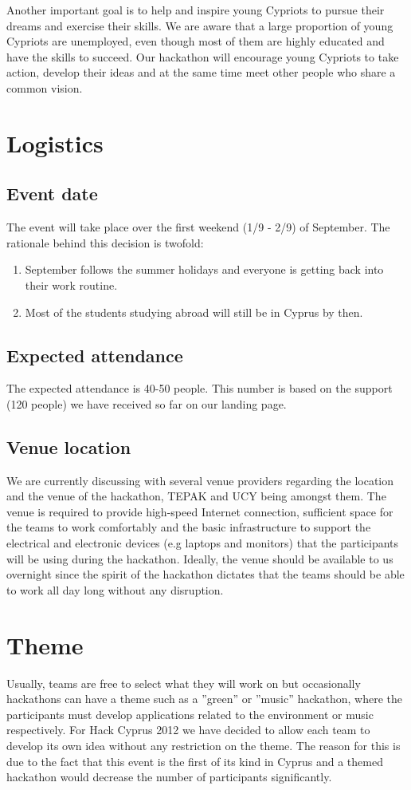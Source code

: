 \documentclass[a4paper,11pt]{report}
\begin{document}
Another important goal is to help and inspire young Cypriots to pursue their dreams and exercise their skills. We are aware that a large proportion of young Cypriots are unemployed, even though most of them are highly educated and have the skills to succeed. Our hackathon will encourage young Cypriots to take action, develop their ideas and at the same time meet other people who share a common vision. 

\section{Logistics}
\subsection{Event date}
The event will take place over the first weekend (1/9 - 2/9) of September. The rationale behind this decision is twofold:
\begin{enumerate}
  \item September follows the summer holidays and everyone is getting back into their work routine.
  \item Most of the students studying abroad will still be in Cyprus by then.
\end{enumerate}
\subsection{Expected attendance}
The expected attendance is 40-50 people. This number is based on the support (120 people) we have received so far on our landing page.
\subsection{Venue location}
We are currently discussing with several venue providers regarding the location and the venue of the hackathon, TEPAK and UCY being amongst them. The venue is required to provide high-speed Internet connection, sufficient space for the teams to work comfortably and the basic infrastructure to support the electrical and electronic devices (e.g laptops and monitors) that the participants will be using during the hackathon. Ideally, the venue should be available to us overnight since the spirit of the hackathon dictates that the teams should be able to work all day long without any disruption. 
 
\section{Theme}
Usually, teams are free to select what they will work on but occasionally hackathons can have a theme such as a ''green'' or ''music'' hackathon, where the participants must develop applications related to the environment or music respectively. For Hack Cyprus 2012 we have decided to allow each team to develop its own idea without any restriction on the theme. The reason for this is due to the fact that this event is the first of its kind in Cyprus and a themed hackathon would decrease the number of participants significantly. 
\end{document}
